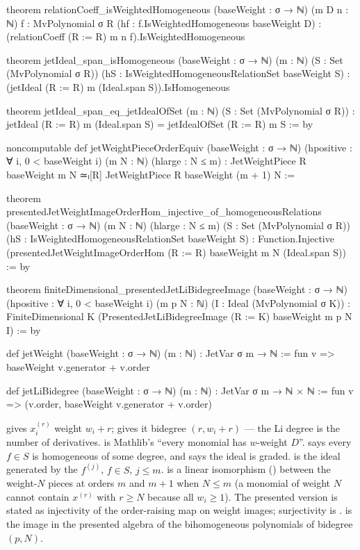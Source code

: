 \begin{leancode}
theorem relationCoeff_isWeightedHomogeneous (baseWeight : σ → ℕ) (m D n : ℕ)
    {f : MvPolynomial σ R} (hf : f.IsWeightedHomogeneous baseWeight D) :
    (relationCoeff (R := R) m n f).IsWeightedHomogeneous

theorem jetIdeal_span_isHomogeneous (baseWeight : σ → ℕ) (m : ℕ)
    (S : Set (MvPolynomial σ R)) (hS : IsWeightedHomogeneousRelationSet baseWeight S) :
    (jetIdeal (R := R) m (Ideal.span S)).IsHomogeneous

theorem jetIdeal_span_eq_jetIdealOfSet (m : ℕ) (S : Set (MvPolynomial σ R)) :
    jetIdeal (R := R) m (Ideal.span S) = jetIdealOfSet (R := R) m S := by

noncomputable def jetWeightPieceOrderEquiv (baseWeight : σ → ℕ)
    (hpositive : ∀ i, 0 < baseWeight i) (m N : ℕ) (hlarge : N ≤ m) :
    JetWeightPiece R baseWeight m N ≃ₗ[R] JetWeightPiece R baseWeight (m + 1) N :=

theorem presentedJetWeightImageOrderHom_injective_of_homogeneousRelations
    (baseWeight : σ → ℕ) (m N : ℕ) (hlarge : N ≤ m)
    (S : Set (MvPolynomial σ R)) (hS : IsWeightedHomogeneousRelationSet baseWeight S) :
    Function.Injective
      (presentedJetWeightImageOrderHom (R := R) baseWeight m N (Ideal.span S)) := by

theorem finiteDimensional_presentedJetLiBidegreeImage
    (baseWeight : σ → ℕ) (hpositive : ∀ i, 0 < baseWeight i)
    (m p N : ℕ) (I : Ideal (MvPolynomial σ K)) :
    FiniteDimensional K (PresentedJetLiBidegreeImage
      (R := K) baseWeight m p N I) := by

def jetWeight (baseWeight : σ → ℕ) (m : ℕ) : JetVar σ m → ℕ :=
  fun v => baseWeight v.generator + v.order

def jetLiBidegree (baseWeight : σ → ℕ) (m : ℕ) : JetVar σ m → ℕ × ℕ :=
  fun v => (v.order, baseWeight v.generator + v.order)
\end{leancode}

\begin{dictionary}
 gives $x_i^{(r)}$ weight $w_i+r$;  gives it bidegree $(r,w_i+r)$ --- the Li
degree is the number of derivatives.  is Mathlib's ``every monomial has
$w$-weight $D$''.  says every $f\in S$ is homogeneous of
some degree, and  says the ideal is graded.  is the ideal
generated by the $f^{(j)}$, $f\in S$, $j\le m$.  is a linear isomorphism
() between the weight-$N$ pieces at orders $m$ and $m+1$ when $N\le m$ (a monomial of weight $N$
cannot contain $x^{(r)}$ with $r\ge N$ because all $w_i\ge1$). The presented version is stated as injectivity
of the order-raising map on weight images; surjectivity is \allowbreak{}.
 is the image in the presented algebra of the bihomogeneous polynomials of
bidegree $(p,N)$.
\end{dictionary}


